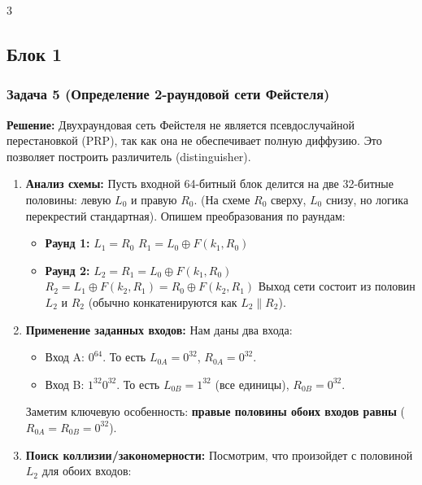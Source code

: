 ﻿\documentclass[9pt,a4paper,landscape]{extarticle}
\newcommand{\tightlist}{}
\begin{document}
\begin{multicols*}{3}

\subsection{Блок 1}\label{ux431ux43bux43eux43a-1}

\subsubsection{Задача 5 (Определение 2-раундовой сети Фейстеля)}\label{ux437ux430ux434ux430ux447ux430-5-ux43eux43fux440ux435ux434ux435ux43bux435ux43dux438ux435-2-ux440ux430ux443ux43dux434ux43eux432ux43eux439-ux441ux435ux442ux438-ux444ux435ux439ux441ux442ux435ux43bux44f}

\textbf{Решение:} Двухраундовая сеть Фейстеля не является псевдослучайной перестановкой (PRP), так как она не обеспечивает полную диффузию. Это позволяет построить различитель (distinguisher).

\begin{enumerate}
\def\labelenumi{\arabic{enumi}.}
\item
  \textbf{Анализ схемы:} Пусть входной 64-битный блок делится на две 32-битные половины: левую \(L_0\) и правую \(R_0\). (На схеме \(R_0\) сверху, \(L_0\) снизу, но логика перекрестий стандартная). Опишем преобразования по раундам:

  \begin{itemize}
  \tightlist
  \item
    \textbf{Раунд 1:} \(L_1 = R_0\) \(R_1 = L_0 \oplus F(k_1, R_0)\)
  \item
    \textbf{Раунд 2:} \(L_2 = R_1 = L_0 \oplus F(k_1, R_0)\) \(R_2 = L_1 \oplus F(k_2, R_1) = R_0 \oplus F(k_2, R_1)\) Выход сети состоит из половин \(L_2\) и \(R_2\) (обычно конкатенируются как \(L_2 \parallel R_2\)).
  \end{itemize}
\item
  \textbf{Применение заданных входов:} Нам даны два входа:

  \begin{itemize}
  \tightlist
  \item
    Вход A: \(0^{64}\). То есть \(L_{0A} = 0^{32}\), \(R_{0A} = 0^{32}\).
  \item
    Вход B: \(1^{32}0^{32}\). То есть \(L_{0B} = 1^{32}\) (все единицы), \(R_{0B} = 0^{32}\).
  \end{itemize}

  Заметим ключевую особенность: \textbf{правые половины обоих входов равны} (\(R_{0A} = R_{0B} = 0^{32}\)).
\item
  \textbf{Поиск коллизии/закономерности:} Посмотрим, что произойдет с половиной \(L_2\) для обоих входов:


\end{enumerate}
\end{multicols*}
\end{document}
